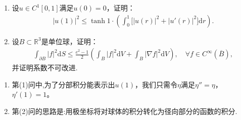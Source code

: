\documentclass[../../main.tex]{subfiles}%
\begin{document}
\begin{example}
\begin{enumerate}[(1)]
\item 设$u\in C^1[0,1]$满足$u(0)=0$，证明：
\begin{align*}
|u(1)|^2 \leqslant \tanh 1\cdot \left( \int_{0}^{1}\bigl[|u(r)|^2+|u'(r)|^2\bigr]\mathrm{d}r \right).
\end{align*}

\item 设$B\subset\mathbb{R}^3$是单位球，证明：
\begin{align*}
\int_{\partial B}|f|^2\mathrm{d}S\leqslant \frac{e^2-1}{2}\left( \int_{B}|f|^2\mathrm{d}V+\int_{B}|\nabla f|^2\mathrm{d}V \right),\quad \forall f\in C^\infty(\overline{B}),
\end{align*}
并证明系数不可改进.
\end{enumerate}
\end{example}
\begin{remark}
\begin{enumerate}[(1)]
\item 第(1)问中,为了分部积分能表示出$u(1)$，我们只需令$\eta$满足$\eta''=\eta$，$\eta'(1)=1$。

\item 第(2)问的思路是:用极坐标将对球体的积分转化为径向部分的函数的积分.
\end{enumerate}
\end{remark}
\end{document}
